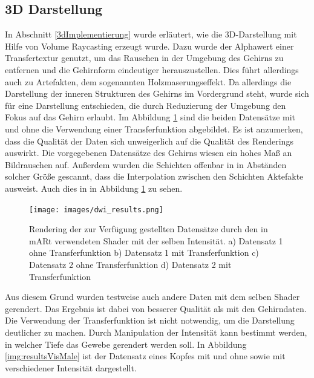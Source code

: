 \subsection{3D Darstellung}

In Abschnitt \ref{3dImplementierung} wurde erläutert, wie die 3D-Darstellung mit Hilfe von Volume Raycasting erzeugt wurde. 
Dazu wurde der Alphawert einer Transfertextur genutzt, um das Rauschen in der Umgebung des Gehirns zu entfernen und die Gehirnform eindeutiger herauszustellen. Dies führt allerdings auch zu Artefakten, dem sogenannten Holzmaserungseffekt. Da allerdings die Darstellung der inneren Strukturen des Gehirns im Vordergrund steht, wurde sich für eine Darstellung entschieden, die durch Reduzierung der Umgebung den Fokus auf das Gehirn erlaubt. 
Im Abbildung \ref{img:resultsDWI} sind die beiden Datensätze mit und ohne die Verwendung einer Transferfunktion abgebildet. 
Es ist anzumerken, dass die Qualität der Daten sich unweigerlich auf die Qualität des Renderings auswirkt. Die vorgegebenen Datensätze des Gehirns wiesen ein hohes Maß an Bildrauschen auf. Außerdem wurden die Schichten offenbar in in Abständen solcher Größe gescannt, dass die Interpolation zwischen den Schichten Aktefakte ausweist. Auch dies in in Abbildung \ref{img:resultsDWI} zu sehen.

\begin{figure}[!htb]
	\centering
	\texttt{[image: images/dwi\_results.png]}
	\caption{Rendering der zur Verfügung gestellten Datensätze durch den in mARt verwendeten Shader mit der selben Intensität. a) Datensatz 1 ohne Transferfunktion b) Datensatz 1 mit Transferfunktion c) Datensatz 2 ohne Transferfunktion d) Datensatz 2 mit Transferfunktion}
	\label{img:resultsDWI}
\end{figure}
\FloatBarrier
  
Aus diesem Grund wurden testweise auch andere Daten mit dem selben Shader gerendert. Das Ergebnis ist dabei von besserer Qualität als mit den Gehirndaten. Die Verwendung der Transferfunktion ist nicht notwendig, um die Darstellung deutlicher zu machen. Durch Manipulation der Intensität kann bestimmt werden, in welcher Tiefe das Gewebe gerendert werden soll. In Abbildung \ref{img:resultsVisMale} ist der Datensatz eines Kopfes mit und ohne sowie mit verschiedener Intensität dargestellt.
  

